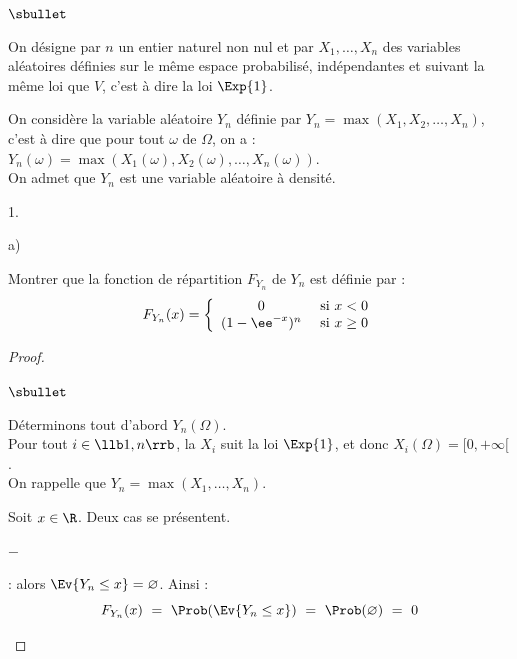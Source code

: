 \documentclass[11pt]{article}%
\begin{document}
\begin{noliste}{$\sbullet$}
\item On désigne par $n$ un entier naturel non nul et par $X_{1},
  \ldots, X_{n}$ des variables aléatoires définies sur le même espace
  probabilisé, indépendantes et suivant la même loi que $V$, c'est à
  dire la loi $\Exp{1}$.

\item On considère la variable aléatoire $Y_{n}$ définie par $Y_{n} =
  \max(X_{1},X_{2}, \ldots,X_{n})$, c'est à dire que pour tout
  $\omega$ de $\Omega$, on a : $Y_{n}(\omega) =
  \max(X_{1}(\omega),X_{2}(\omega), \ldots, X_n(\omega))$.\\
  On admet que $Y_{n}$ est une variable aléatoire à densité.
\end{noliste}

\begin{noliste}{1.}
  \setlength{\itemsep}{4mm} %
  \setcounter{enumi}{1}
\item
  \begin{noliste}{a)}
    \setlength{\itemsep}{2mm}
  \item Montrer que la fonction de répartition $F_{Y_{n}}$ de $Y_{n}$
    est définie par :
    \[
    F_{Y_{n}}(x) = \left\{
      \begin{array}{cl}
        0 & \hbox{ si } x<0\\
        (1-\ee^{-x})^{n} & \hbox{ si } x \geq 0
      \end{array}
    \right.
    \]
    
    \begin{proof}~
      \begin{noliste}{$\sbullet$}
      \item Déterminons tout d'abord $Y_n(\Omega)$.\\
	Pour tout $i\in\llb 1,n\rrb$, la \var $X_i$ suit la loi
        $\Exp{1}$, et donc $X_i(\Omega)=[0,+\infty[$.\\
        On rappelle que $Y_n= \max(X_1,\hdots, X_n)$. 
        \conc{Ainsi, $Y_n(\Omega) \ \subset \ [0,+\infty[$.}
	
      \item Soit $x \in \R$. Deux cas se présentent.
	\begin{noliste}{$-$}
        \item {} : alors $\Ev{Y_n\leq x} =
          \varnothing$.
          Ainsi :
	  \[
          F_{Y_n}(x) \ = \ \Prob(\Ev{Y_n\leq x}) \ = \
          \Prob(\varnothing) \ = \ 0
	  \]


\end{noliste}
\end{noliste}
\end{proof}
\end{noliste}
\end{noliste}
\end{document}
